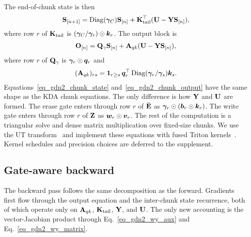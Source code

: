 \documentclass[10pt, logo, onecolumn, copyright]{nv}
\begin{document}
The end-of-chunk state is then
\begin{align}
    {\mathbf{S}}_{[n+1]}
    =
    \operatorname{Diag}(\boldsymbol{\gamma}_C){\mathbf{S}}_{[n]}
    +
    {\mathbf{K}}_{\mathrm{tail}}^\top({\mathbf{U}} - {\mathbf{Y}}{\mathbf{S}}_{[n]}),
\label{eq_gdn2_chunk_state}
\end{align}
where row $r$ of ${\mathbf{K}}_{\mathrm{tail}}$ is $(\boldsymbol{\gamma}_C / \boldsymbol{\gamma}_r)\odot{\bm{k}}_r$. The output block is
\begin{align}
    {\mathbf{O}}_{[n]}
    =
    {\mathbf{Q}}_{\gamma}{\mathbf{S}}_{[n]}
    +
    {\mathbf{A}}_{qk}({\mathbf{U}} - {\mathbf{Y}}{\mathbf{S}}_{[n]}),
\label{eq_gdn2_chunk_output}
\end{align}
where row $r$ of ${\mathbf{Q}}_{\gamma}$ is $\boldsymbol{\gamma}_r\odot{\bm{q}}_r$ and
\begin{align}
    ({\mathbf{A}}_{qk})_{rs}
    =
    \mathbf{1}_{r\ge s}\,
    {\bm{q}}_r^\top
    \operatorname{Diag}(\boldsymbol{\gamma}_r / \boldsymbol{\gamma}_s)
    {\bm{k}}_s .
\label{eq_gdn2_chunk_scores}
\end{align}
Equations~\ref{eq_gdn2_chunk_state} and~\ref{eq_gdn2_chunk_output} have the same shape as the KDA chunk equations. The only difference is how ${\mathbf{Y}}$ and ${\mathbf{U}}$ are formed. The erase gate enters through row $r$ of $\bar{{\mathbf{E}}}$ as $\boldsymbol{\gamma}_r\odot({\bm{b}}_r\odot{\bm{k}}_r)$. The write gate enters through row $r$ of ${\mathbf{Z}}$ as ${\bm{w}}_r\odot{\bm{v}}_r$. The rest of the computation is a triangular solve and dense matrix multiplication over fixed-size chunks. We use the UT transform~\citep{Joffrain2006AccumulatingHT} and implement these equations with fused Triton kernels~\citep{tillet_triton_2019}. Kernel schedules and precision choices are deferred to the supplement.

\subsection{Gate-aware backward}
\label{subsec_gate_aware_backward}

The backward pass follows the same decomposition as the forward. Gradients first flow through the output equation and the inter-chunk state recurrence, both of which operate only on ${\mathbf{A}}_{qk}$, ${\mathbf{K}}_{\mathrm{tail}}$, ${\mathbf{Y}}$, and ${\mathbf{U}}$. The only new accounting is the vector-Jacobian product through Eq.~\ref{eq_gdn2_wy_aux} and Eq.~\ref{eq_gdn2_wy_matrix}.
\end{document}
